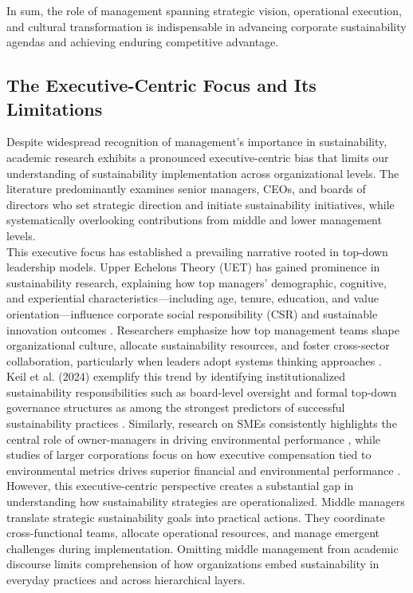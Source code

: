 	In sum, the role of management spanning strategic vision, operational execution, and cultural transformation is indispensable in advancing corporate sustainability agendas and achieving enduring competitive advantage.
	
	\subsection{The Executive-Centric Focus and Its Limitations}
	Despite widespread recognition of management’s importance in sustainability, academic research exhibits a pronounced executive-centric bias that limits our understanding of sustainability implementation across organizational levels. The literature predominantly examines senior managers, CEOs, and boards of directors who set strategic direction and initiate sustainability initiatives, while systematically overlooking contributions from middle and lower management levels. \\
	
	This executive focus has established a prevailing narrative rooted in top-down leadership models. Upper Echelons Theory (UET) has gained prominence in sustainability research, explaining how top managers’ demographic, cognitive, and experiential characteristics—including age, tenure, education, and value orientation—influence corporate social responsibility (CSR) and sustainable innovation outcomes \cite{Waldman2008, Ioannou2015}. Researchers emphasize how top management teams shape organizational culture, allocate sustainability resources, and foster cross-sector collaboration, particularly when leaders adopt systems thinking approaches \cite{Dyllick2016}. \\
	
	Keil et al. (2024) exemplify this trend by identifying institutionalized sustainability responsibilities such as board-level oversight and formal top-down governance structures as among the strongest predictors of successful sustainability practices \cite{keil2024c}. Similarly, research on SMEs consistently highlights the central role of owner-managers in driving environmental performance \cite{kutzschbach2021c}, while studies of larger corporations focus on how executive compensation tied to environmental metrics drives superior financial and environmental performance \cite{Eccles2014}. \\
	
	However, this executive-centric perspective creates a substantial gap in understanding how sustainability strategies are operationalized. Middle managers translate strategic sustainability goals into practical actions. They coordinate cross-functional teams, allocate operational resources, and manage emergent challenges during implementation. Omitting middle management from academic discourse limits comprehension of how organizations embed sustainability in everyday practices and across hierarchical layers. \\
	
